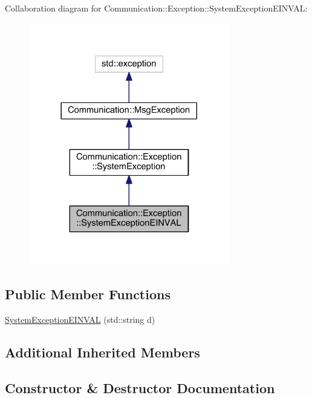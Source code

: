 Collaboration diagram for Communication\+:\+:Exception\+:\+:System\+Exception\+E\+I\+N\+V\+A\+L\+:\nopagebreak
\begin{figure}[H]
\begin{center}
\leavevmode
\includegraphics[width=248pt]{class_communication_1_1_exception_1_1_system_exception_e_i_n_v_a_l__coll__graph}
\end{center}
\end{figure}
\subsection*{Public Member Functions}
\begin{DoxyCompactItemize}
\item 
\hyperlink{class_communication_1_1_exception_1_1_system_exception_e_i_n_v_a_l_a714fd4e3b26c42bff488bbf967c7303a}{System\+Exception\+E\+I\+N\+V\+A\+L} (std\+::string d)
\end{DoxyCompactItemize}
\subsection*{Additional Inherited Members}


\subsection{Constructor \& Destructor Documentation}
\hypertarget{class_communication_1_1_exception_1_1_system_exception_e_i_n_v_a_l_a714fd4e3b26c42bff488bbf967c7303a}{}
